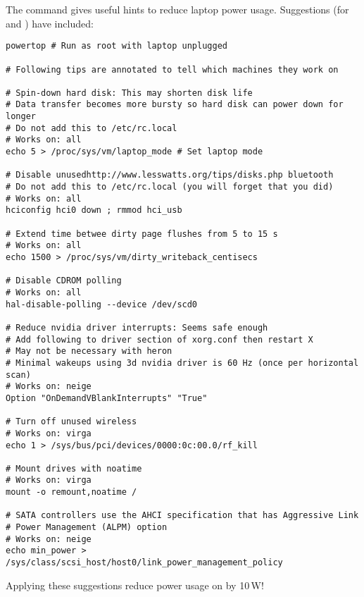 \documentclass[12pt,twoside]{article}
\begin{document}
The   command gives useful hints to
reduce laptop power usage.
Suggestions (for  and ) have included:
\begin{verbatim}
powertop # Run as root with laptop unplugged

# Following tips are annotated to tell which machines they work on

# Spin-down hard disk: This may shorten disk life
# Data transfer becomes more bursty so hard disk can power down for longer
# Do not add this to /etc/rc.local
# Works on: all
echo 5 > /proc/sys/vm/laptop_mode # Set laptop mode

# Disable unusedhttp://www.lesswatts.org/tips/disks.php bluetooth
# Do not add this to /etc/rc.local (you will forget that you did)
# Works on: all
hciconfig hci0 down ; rmmod hci_usb

# Extend time betwee dirty page flushes from 5 to 15 s
# Works on: all
echo 1500 > /proc/sys/vm/dirty_writeback_centisecs

# Disable CDROM polling
# Works on: all
hal-disable-polling --device /dev/scd0

# Reduce nvidia driver interrupts: Seems safe enough
# Add following to driver section of xorg.conf then restart X
# May not be necessary with heron
# Minimal wakeups using 3d nvidia driver is 60 Hz (once per horizontal scan)
# Works on: neige
Option "OnDemandVBlankInterrupts" "True" 

# Turn off unused wireless
# Works on: virga
echo 1 > /sys/bus/pci/devices/0000:0c:00.0/rf_kill

# Mount drives with noatime
# Works on: virga
mount -o remount,noatime /

# SATA controllers use the AHCI specification that has Aggressive Link
# Power Management (ALPM) option
# Works on: neige
echo min_power > /sys/class/scsi_host/host0/link_power_management_policy
\end{verbatim}
Applying these suggestions reduce power usage on  by
10\,W! 
\end{document}
